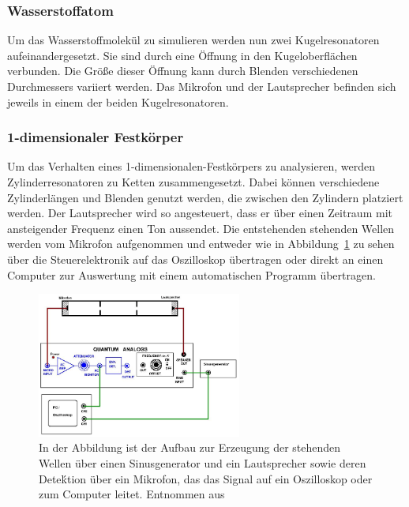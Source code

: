             \FloatBarrier
        \newpage
        \subsubsection*{Wasserstoffatom}
            Um das Wasserstoffmolekül zu simulieren werden nun zwei Kugelresonatoren aufeinandergesetzt. Sie sind durch eine Öffnung in den Kugeloberflächen verbunden. Die Größe dieser Öffnung kann durch 
            Blenden verschiedenen Durchmessers variiert werden. Das Mikrofon und der Lautsprecher befinden sich jeweils in einem der beiden Kugelresonatoren.

        \subsubsection*{1-dimensionaler Festkörper}
            Um das Verhalten eines 1-dimensionalen-Festkörpers zu analysieren, werden Zylinderresonatoren zu Ketten zusammengesetzt. Dabei können verschiedene Zylinderlängen und Blenden genutzt werden, die 
            zwischen den Zylindern platziert werden. Der Lautsprecher wird so angesteuert, dass er über einen Zeitraum mit ansteigender Frequenz einen Ton aussendet. Die entstehenden stehenden Wellen werden 
            vom Mikrofon aufgenommen und entweder wie in Abbildung~\ref{fig:fk_Aufbau} zu sehen über die Steuerelektronik auf das Oszilloskop übertragen oder direkt an einen Computer zur Auswertung mit 
            einem automatischen Programm übertragen. 
            \FloatBarrier

            \begin{figure}[h]
              \centering
              \includegraphics[width = 0.6\textwidth]{pictures/fk_aufbau.png}
              \caption{In der Abbildung ist der Aufbau zur Erzeugung der stehenden Wellen über einen Sinusgenerator und ein Lautsprecher sowie deren Deteḱtion über ein Mikrofon, das das Signal auf ein Oszilloskop oder zum Computer leitet. Entnommen aus~\cite{tu_dortmund_versuchsanleitung_2021-4}}
              \label{fig:fk_Aufbau}
            \end{figure}

